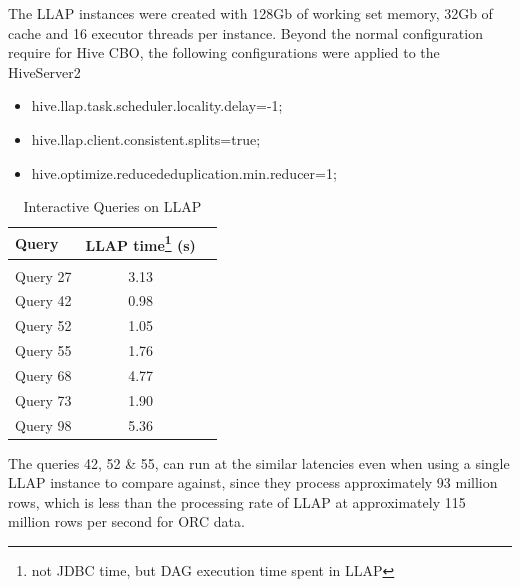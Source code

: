 The LLAP instances were created with 128Gb of working set memory, 32Gb of cache and 16 executor threads per
instance. Beyond the normal configuration require for Hive CBO, the following configurations were applied to
the HiveServer2

\begin{itemize}
\item hive.llap.task.scheduler.locality.delay=-1;
\item hive.llap.client.consistent.splits=true;
\item hive.optimize.reducededuplication.min.reducer=1;
\end{itemize}

\begin{table}[h]
\begin{tabular}{l|*{1}cr}
Query & LLAP time\footnote{not JDBC time, but DAG execution time spent in LLAP} (s)\\
\hline \\
Query 27 & 3.13  \\
Query 42 & 0.98  \\
Query 52 & 1.05  \\
Query 55 & 1.76  \\
Query 68 & 4.77  \\
Query 73 & 1.90  \\
Query 98 & 5.36  \\
\end{tabular}
\caption{Interactive Queries on LLAP}
\end{table}

The queries 42, 52 \& 55, can run at the similar latencies even when using a single LLAP instance to compare against, since they process
approximately 93 million rows, which is less than the processing rate of LLAP at approximately 115 million rows per second for ORC data.
